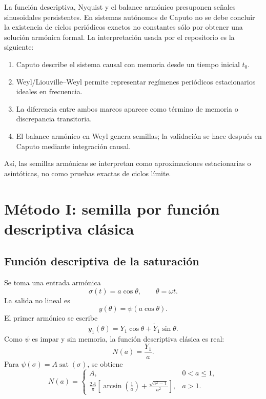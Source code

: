 \documentclass[11pt]{article}
\newcommand{\sat}{\operatorname{sat}}
\begin{document}
La función descriptiva, Nyquist y el balance armónico presuponen señales sinusoidales persistentes. En sistemas autónomos de Caputo no se debe concluir la existencia de ciclos periódicos exactos no constantes sólo por obtener una solución armónica formal. La interpretación usada por el repositorio es la siguiente:
\begin{enumerate}[label=\alph*)]
\item Caputo describe el sistema causal con memoria desde un tiempo inicial \(t_0\).
\item Weyl/Liouville--Weyl permite representar regímenes periódicos estacionarios ideales en frecuencia.
\item La diferencia entre ambos marcos aparece como término de memoria o discrepancia transitoria.
\item El balance armónico en Weyl genera semillas; la validación se hace después en Caputo mediante integración causal.
\end{enumerate}
Así, las semillas armónicas se interpretan como aproximaciones estacionarias o asintóticas, no como pruebas exactas de ciclos límite.

\section{Método I: semilla por función descriptiva clásica}

\subsection{Función descriptiva de la saturación}

Se toma una entrada armónica
\begin{equation}
\sigma(t)=a\cos\theta,
\qquad \theta=\omega t.
\end{equation}
La salida no lineal es
\begin{equation}
y(\theta)=\psi(a\cos\theta).
\end{equation}
El primer armónico se escribe
\begin{equation}
y_1(\theta)=Y_1\cos\theta+\widetilde Y_1\sin\theta.
\end{equation}
Como \(\psi\) es impar y sin memoria, la función descriptiva clásica es real:
\begin{equation}
N(a)=\frac{Y_1}{a}.
\end{equation}
Para \(\psi(\sigma)=A\sat(\sigma)\), se obtiene
\begin{equation}
N(a)=
\begin{cases}
A, & 0<a\leq 1,\\[6pt]
\displaystyle
\frac{2A}{\pi}\left[\arcsin\left(\frac{1}{a}\right)+\frac{\sqrt{a^2-1}}{a^2}\right], & a>1.
\end{cases}
\label{eq:N_classic_sat}
\end{equation}
\end{document}
